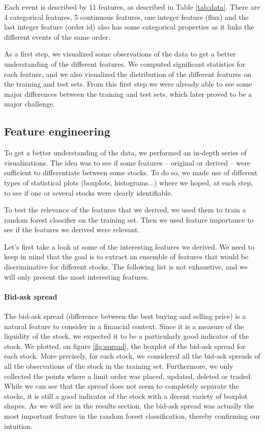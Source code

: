 \documentclass[switch, 11pt]{article}
\begin{document}
\begin{multicols}{2}
    Each event is described by 11 features, as described in Table \ref{tab:data}. There are 4 categorical features, 5 continuous features, one integer feature (flux) and the last integer feature (order id) also has some categorical properties as it links the different events of the same order.

    As a first step, we visualized some observations of the data to get a better understanding of the different features. We computed significant statistics for each feature, and we also visualized the distribution of the different features on the training and test sets. From this first step we were already able to see some major differences between the training and test sets, which later proved to be a major challenge.

    \subsection{Feature engineering}
    To get a better understanding of the data, we performed an in-depth series of visualizations. The idea was to see if some features -- original or derived -- were sufficient to differentiate between some stocks. To do so, we made use of different types of statistical plots (boxplots, histograms...) where we hoped, at each step, to see if one or several stocks were clearly identifiable.

    To test the relevance of the features that we derived, we used them to train a random forest classifier on the training set. Then we used feature importance to see if the features we derived were relevant.

    Let's first take a look at some of the interesting features we derived. We need to keep in mind that the goal is to extract an ensemble of features that would be discriminative for different stocks. The following list is not exhaustive, and we will only present the most interesting features.

    \paragraph{Bid-ask spread}
    The bid-ask spread (difference between the best buying and selling price) is a natural feature to consider in a financial context. Since it is a measure of the liquidity of the stock, we expected it to be a particularly good indicator of the stock. We plotted, on figure \ref{fig:spread}, the boxplot of the bid-ask spread for each stock. More precisely, for each stock, we considered all the bid-ask spreads of all the observations of the stock in the training set. Furthermore, we only collected the points where a limit order was placed, updated, deleted or traded. While we can see that the spread does not seem to completely separate the stocks, it is still a good indicator of the stock with a decent variety of boxplot shapes. As we will see in the results section, the bid-ask spread was actually the most important feature in the random forest classification, thereby confirming our intuition.


\end{multicols}
\end{document}
